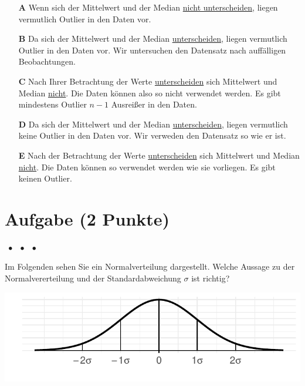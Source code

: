 \documentclass[a4paper, 9pt]{scrartcl}\usepackage[]{graphicx}\usepackage[]{xcolor}
\makeatletter
\def\maxwidth{ %
  \ifdim\Gin@nat@width>\linewidth
    \linewidth
  \else
    \Gin@nat@width
  \fi
}
\makeatother
\begin{document}
\begin{enumerate}
\item [\textbf{A} \msquare] Wenn sich der Mittelwert und der Median \underline{nicht unterscheiden}, liegen vermutlich Outlier in den Daten vor.
\item [\textbf{B} \msquare] Da sich der Mittelwert und der Median \underline{unterscheiden}, liegen vermutlich Outlier in den Daten vor. Wir untersuchen den Datensatz nach auffälligen Beobachtungen.
\item [\textbf{C} \msquare] Nach Ihrer Betrachtung der Werte \underline{unterscheiden} sich Mittelwert und Median \underline{nicht}. Die Daten können also so nicht verwendet werden. Es gibt mindestens Outlier $n-1$ Ausreißer in den Daten.
\item [\textbf{D} \msquare] Da sich der Mittelwert und der Median \underline{unterscheiden}, liegen vermutlich keine Outlier in den Daten vor. Wir verweden den Datensatz so wie er ist.
\item [\textbf{E} \msquare] Nach der Betrachtung der Werte \underline{unterscheiden} sich Mittelwert und Median \underline{nicht}. Die Daten können so verwendet werden wie sie vorliegen. Es gibt keinen Outlier.
\end{enumerate}

\section{Aufgabe \hfill (2 Punkte)}

\ifcollection
\begin{flushright}
\tiny\vspace{-2Ex}
\textbf{\examinhaltstart}
\exammodulestat $\;\bullet$
\exammodulestatbbv $\;\bullet$
\exammodulestatversuch $\;\bullet$
\exammodulebiostat
\vspace{-1Ex}
\end{flushright}
\fi




Im Folgenden sehen Sie ein Normalverteilung dargestellt. Welche Aussage zu der Normalvererteilung und der Standardabweichung $\sigma$ ist richtig?



{\centering \includegraphics[width=\maxwidth]{img/mc-distribution-02-a-1} 

}
\end{document}
